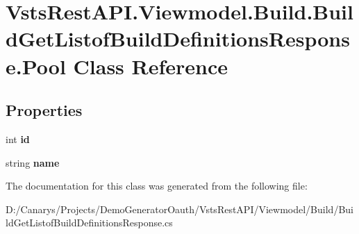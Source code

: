 \hypertarget{class_vsts_rest_a_p_i_1_1_viewmodel_1_1_build_1_1_build_get_listof_build_definitions_response_1_1_pool}{}\section{Vsts\+Rest\+A\+P\+I.\+Viewmodel.\+Build.\+Build\+Get\+Listof\+Build\+Definitions\+Response.\+Pool Class Reference}
\label{class_vsts_rest_a_p_i_1_1_viewmodel_1_1_build_1_1_build_get_listof_build_definitions_response_1_1_pool}
\subsection*{Properties}
\begin{DoxyCompactItemize}
\item 
\mbox{\label{class_vsts_rest_a_p_i_1_1_viewmodel_1_1_build_1_1_build_get_listof_build_definitions_response_1_1_pool_a987515e5795e7e6b1d7556907cf5c964}} 
int {\bfseries id}
\item 
\mbox{\label{class_vsts_rest_a_p_i_1_1_viewmodel_1_1_build_1_1_build_get_listof_build_definitions_response_1_1_pool_ab61cd4b03d139ddd224f36b363e34e6b}} 
string {\bfseries name}
\end{DoxyCompactItemize}


The documentation for this class was generated from the following file\+:\begin{DoxyCompactItemize}
\item 
D\+:/\+Canarys/\+Projects/\+Demo\+Generator\+Oauth/\+Vsts\+Rest\+A\+P\+I/\+Viewmodel/\+Build/Build\+Get\+Listof\+Build\+Definitions\+Response.\+cs\end{DoxyCompactItemize}
